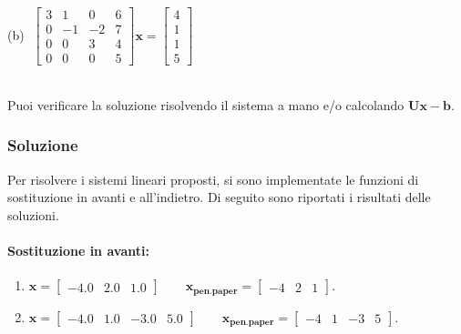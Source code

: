 \documentclass[letterpaper, 12pt]{article}
\numberwithin{equation}{section}    %
\begin{document}
\hfill
\begin{minipage}{0.48\textwidth}
    (b) $\;\begin{bmatrix}
        3 & 1 & 0 & 6 \\
        0 & -1 & -2 & 7 \\
        0 & 0 & 3 & 4 \\
        0 & 0 & 0 & 5
        \end{bmatrix} \mathbf{x} = \begin{bmatrix}
        4 \\ 1 \\ 1 \\ 5
        \end{bmatrix}$
\end{minipage}
\\
Puoi verificare la soluzione risolvendo il sistema a mano e/o calcolando $\mathbf{U}\mathbf{x} - \mathbf{b}$.
\subsubsection{Soluzione}
Per risolvere i sistemi lineari proposti, si sono implementate le funzioni di sostituzione in avanti e all'indietro. 
Di seguito sono riportati i risultati delle soluzioni.
\paragraph{Sostituzione in avanti:}
\begin{enumerate}[label=(\alph*)]
    \item $\mathbf{x} = \begin{bmatrix} -4.0 & 2.0 & 1.0 \end{bmatrix} \qquad \mathbf{x_{pen.paper}} = \begin{bmatrix} -4 & 2 & 1 \end{bmatrix}$.
    \item $\mathbf{x} = \begin{bmatrix} -4.0 & 1.0 & -3.0 & 5.0 \end{bmatrix} \qquad \mathbf{x_{pen.paper}} = \begin{bmatrix} -4 & 1 & -3 & 5 \end{bmatrix}$.
\end{enumerate}
\end{document}
